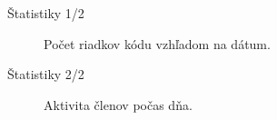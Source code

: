 \documentclass[pdf,fyma2,total]{prosper}
\begin{document}

\begin{slide}{Štatistiky 1/2}

    \begin{center}
        \begin{figure}[h!]
            \caption{\small{Počet riadkov kódu vzhľadom na dátum.}}
            \label{int-obr1}
        \end{figure}
    \end{center}

\end{slide}


\begin{slide}{Štatistiky 2/2}
    \begin{center}
        \begin{figure}[h!]
            \caption{\small{Aktivita členov počas dňa.}}
            \label{int-obr2}
        \end{figure}
    \end{center}
\end{slide}
\end{document}
